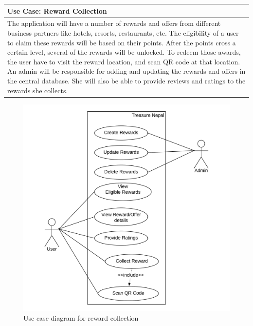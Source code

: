 \documentclass[12pt, a4paper, oneside]{article}
\begin{document}
\vspace{200px}

\begin{table}[H]
\centering
\begin{tabularx}{\linewidth}{|X|} 
\hline
\textbf{Use Case:  Reward Collection}\\ 
\hline
The application will have a number of rewards and offers from different business partners like hotels, resorts, restaurants, etc. The eligibility of a user to claim these rewards will be based on their points. After the points cross a certain level, several of the rewards will be unlocked. To redeem those awards, the user have to visit the reward location, and scan QR code at that location. An admin will be responsible for adding and updating the rewards and offers in the central database. She will also be able to provide reviews and ratings to the rewards she collects.\\
\hline
\end{tabularx}
\end{table}

\begin{figure}[H]
\includegraphics[width=\linewidth]{use-case-diagrams/reward.png}
\centering
\caption{Use case diagram for reward collection}
\label{fig:use-case-reward}
\end{figure}
\end{document}
